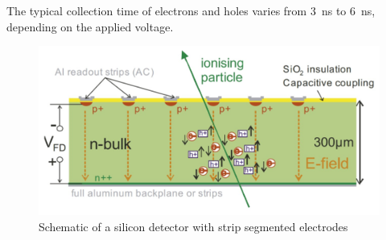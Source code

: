 The typical collection time of electrons and holes varies from 3~ns to 6~ns, depending on the applied voltage.
\begin{figure}[H]
	\centering
	\includegraphics[width=0.7\linewidth]{IMG/ch1/Detector.PNG}
	\caption{Schematic of a silicon detector with strip segmented electrodes}
	\label{fig:detector}
\end{figure}
